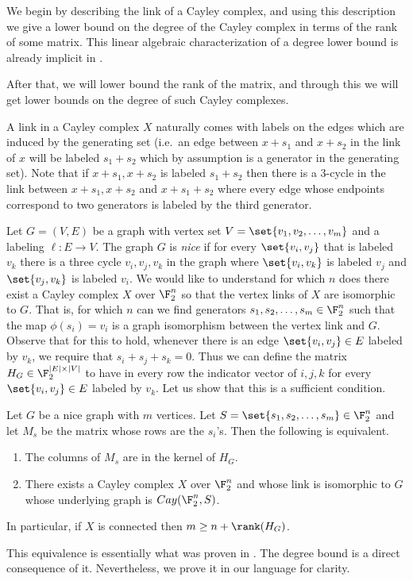     We begin by describing the link of a Cayley complex, and using this description we give a lower bound on the degree of the Cayley complex in terms of the rank of some matrix. This linear algebraic characterization of a degree lower bound is already implicit in \cite[Section 6]{Golowich2023}. 
    
    After that, we will lower bound the rank of the matrix, and through this we will get lower bounds on the degree of such Cayley complexes.  
    
    A link in a Cayley complex \(X\) naturally comes with labels on the edges which are induced by the generating set (i.e.\ an edge between \(x+s_1\) and \(x+s_2\) in the link of \(x\) will be labeled \(s_1+s_2\) which by assumption is a generator in the generating set). Note that if \(x+s_1,x+s_2\) is labeled \(s_1+s_2\) then there is a \(3\)-cycle in the link between \(x+s_1,x+s_2\) and \(x+s_1+s_2\) where every edge whose endpoints correspond to two generators is labeled by the third generator.

    Let \(G=(V,E)\) be a graph with vertex set \(V=\set{v_1,v_2,\dots,v_m}\) and a labeling \(\ell:E \to V\). The graph \(G\) is \emph{nice} if for every \(\set{v_i,v_j}\) that is labeled \(v_k\) there is a three cycle \(v_i,v_j,v_k\) in the graph where \(\set{v_i,v_k}\) is labeled \(v_j\) and \(\set{v_j,v_k}\) is labeled \(v_i\). We would like to understand for which \(n\) does there exist a Cayley complex \(X\) over $\F_2^n$ so that the vertex links of \(X\) are isomorphic to \(G\). That is, for which \(n\) can we find generators \(s_1,s_2,\dots,s_m \in \F_2^n\) such that the map \(\phi(s_i)=v_i\) is a graph isomorphism between the vertex link and $G$. Observe that for this to hold, whenever there is an edge \(\set{v_i,v_j} \in E\) labeled by \(v_k\), we require  that \(s_i+s_j+s_k = 0\). Thus we can define the matrix \(H_G \in \F_2^{|E| \times |V|}\) to have in every row the indicator vector of \(i,j,k\) for every \(\set{v_i,v_j} \in E\) labeled by \(v_k\). Let us show that this is a sufficient condition.

\begin{claim} \label{claim:deg-lower-bound}
    Let \(G\) be a nice graph with \(m\) vertices. Let \(S = \set{s_1,s_2,\dots,s_m} \in \F_2^n\) and let \(M_s\) be the matrix whose rows are the \(s_i\)'s. Then the following is equivalent.
    \begin{enumerate}
        \item The columns of \(M_s\) are in the kernel of \(H_G\).
        \item There exists a Cayley complex \(X\) over \(\F_2^n\) and whose link is isomorphic to \(G\) whose underlying graph is \(Cay(\F_2^n,S)\).
    \end{enumerate}
    In particular, if $X$ is connected then 
    \(m \geq n + \rank(H_G)\).
\end{claim}
This equivalence is essentially what was proven in \cite[Lemma 77]{Golowich2023}. The degree bound is a direct consequence of it. Nevertheless, we prove it in our language for clarity.

